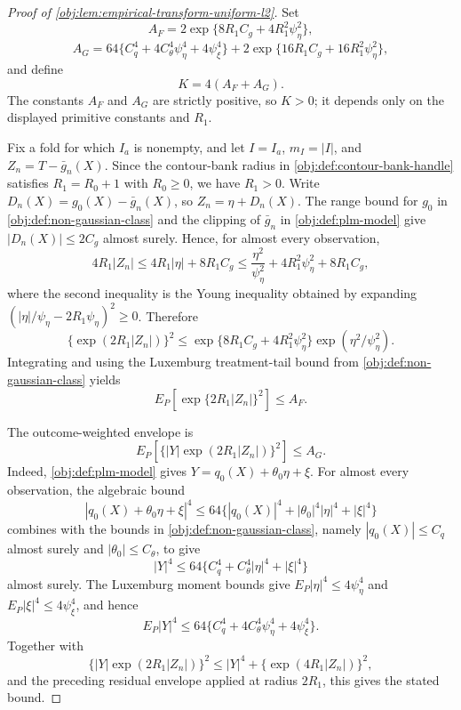 \begin{proof}[Proof of \cref{obj:lem:empirical-transform-uniform-l2}]
Set
\[
A_F=2\exp\{8R_1C_g+4R_1^2\psi_\eta^2\},
\]
\[
A_G=
64\{C_q^4+4C_\theta^4\psi_\eta^4+4\psi_\xi^4\}
+
2\exp\{16R_1C_g+16R_1^2\psi_\eta^2\},
\]
and define
\[
K=4(A_F+A_G).
\]
The constants \(A_F\) and \(A_G\) are strictly positive, so \(K>0\); it
depends only on the displayed primitive constants and \(R_1\). %

Fix a fold for which \(I_a\) is nonempty, and let \(I=I_a\),
\(m_I=|I|\), and \(Z_n=T-\bar g_n(X)\). Since the contour-bank radius in
\cref{obj:def:contour-bank-handle} satisfies \(R_1=R_0+1\) with
\(R_0\ge0\), we have \(R_1>0\). Write
\(D_n(X)=g_0(X)-\bar g_n(X)\), so \(Z_n=\eta+D_n(X)\). The range bound for
\(g_0\) in \cref{obj:def:non-gaussian-class} and the clipping of
\(\bar g_n\) in \cref{obj:def:plm-model} give \(|D_n(X)|\le 2C_g\) almost
surely. Hence, for almost every observation,
\[
4R_1|Z_n|
\le 4R_1|\eta|+8R_1C_g
\le \frac{\eta^2}{\psi_\eta^2}+4R_1^2\psi_\eta^2+8R_1C_g,
\]
where the second inequality is the Young inequality obtained by expanding
\((|\eta|/\psi_\eta-2R_1\psi_\eta)^2\ge0\). Therefore
\[
\{\exp(2R_1|Z_n|)\}^2
\le
\exp\{8R_1C_g+4R_1^2\psi_\eta^2\}
\exp(\eta^2/\psi_\eta^2).
\]
Integrating and using the Luxemburg treatment-tail bound from
\cref{obj:def:non-gaussian-class} yields
\[
E_P\left[\exp\{2R_1|Z_n|\}^2\right]
\le A_F.
\]

The outcome-weighted envelope is
\[
E_P\left[\{|Y|\exp(2R_1|Z_n|)\}^2\right]\le A_G.
\]
Indeed, \cref{obj:def:plm-model} gives \(Y=q_0(X)+\theta_0\eta+\xi\). For
almost every observation, the algebraic bound
\[
|q_0(X)+\theta_0\eta+\xi|^4
\le
64\{|q_0(X)|^4+|\theta_0|^4|\eta|^4+|\xi|^4\}
\]
combines with the bounds in \cref{obj:def:non-gaussian-class}, namely
\(|q_0(X)|\le C_q\) almost surely and \(|\theta_0|\le C_\theta\), to give
\[
|Y|^4
\le
64\{C_q^4+C_\theta^4|\eta|^4+|\xi|^4\}
\]
almost surely. The Luxemburg moment bounds give
\(E_P|\eta|^4\le4\psi_\eta^4\) and \(E_P|\xi|^4\le4\psi_\xi^4\), and hence
\[
E_P|Y|^4
\le
64\{C_q^4+4C_\theta^4\psi_\eta^4+4\psi_\xi^4\}.
\]
Together with
\[
\{|Y|\exp(2R_1|Z_n|)\}^2
\le
|Y|^4+
\{\exp(4R_1|Z_n|)\}^2,
\]
and the preceding residual envelope applied at radius \(2R_1\), this gives the
stated bound. %


\end{proof}
